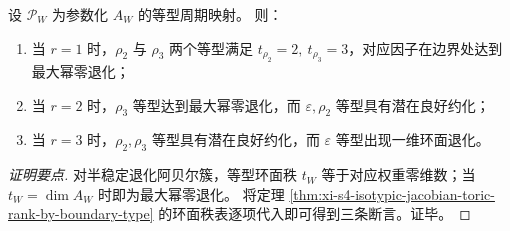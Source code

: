 \begin{proposition}[等型周期映射的最大退化判据]\label{prop:xi-s4-isotypic-period-map-maximal-degeneration}
设 \(\mathcal P_W\) 为参数化 \(A_W\) 的等型周期映射。
则：
\begin{enumerate}
  \item 当 \(r=1\) 时，\(\rho_2\) 与 \(\rho_3\) 两个等型满足 \(t_{\rho_2}=2,\ t_{\rho_3}=3\)，对应因子在边界处达到最大幂零退化；
  \item 当 \(r=2\) 时，\(\rho_3\) 等型达到最大幂零退化，而 \(\varepsilon,\rho_2\) 等型具有潜在良好约化；
  \item 当 \(r=3\) 时，\(\rho_2,\rho_3\) 等型具有潜在良好约化，而 \(\varepsilon\) 等型出现一维环面退化。
\end{enumerate}
\end{proposition}
\begin{proof}[证明要点]
对半稳定退化阿贝尔簇，等型环面秩 \(t_W\) 等于对应权重零维数；当 \(t_W=\dim A_W\) 时即为最大幂零退化。
将定理 \ref{thm:xi-s4-isotypic-jacobian-toric-rank-by-boundary-type} 的环面秩表逐项代入即可得到三条断言。证毕。
\end{proof}
